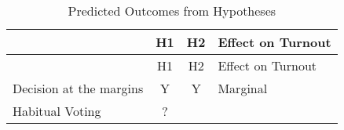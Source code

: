 \documentclass[12pt,twoside]{reedthesis}
\begin{document}
  \begin{longtable}[]{@{}lccl@{}}
  \caption{Predicted Outcomes from Hypotheses}\tabularnewline
  \toprule
  \begin{minipage}[b]{0.37\columnwidth}\raggedright\strut
  \strut
  \end{minipage} & \begin{minipage}[b]{0.06\columnwidth}\centering\strut
  H1\strut
  \end{minipage} & \begin{minipage}[b]{0.06\columnwidth}\centering\strut
  H2\strut
  \end{minipage} & \begin{minipage}[b]{0.25\columnwidth}\raggedright\strut
  Effect on Turnout\strut
  \end{minipage}\tabularnewline
  \midrule
  \endfirsthead
  \toprule
  \begin{minipage}[b]{0.37\columnwidth}\raggedright\strut
  \strut
  \end{minipage} & \begin{minipage}[b]{0.06\columnwidth}\centering\strut
  H1\strut
  \end{minipage} & \begin{minipage}[b]{0.06\columnwidth}\centering\strut
  H2\strut
  \end{minipage} & \begin{minipage}[b]{0.25\columnwidth}\raggedright\strut
  Effect on Turnout\strut
  \end{minipage}\tabularnewline
  \midrule
  \endhead
  \begin{minipage}[t]{0.37\columnwidth}\raggedright\strut
  Decision at the margins\strut
  \end{minipage} & \begin{minipage}[t]{0.06\columnwidth}\centering\strut
  Y\strut
  \end{minipage} & \begin{minipage}[t]{0.06\columnwidth}\centering\strut
  Y\strut
  \end{minipage} & \begin{minipage}[t]{0.25\columnwidth}\raggedright\strut
  Marginal\strut
  \end{minipage}\tabularnewline
  \begin{minipage}[t]{0.37\columnwidth}\raggedright\strut
  Habitual Voting\strut
  \end{minipage} & \begin{minipage}[t]{0.06\columnwidth}\centering\strut
  ?\strut
  \end{minipage} & \begin{minipage}[t]{0.06\columnwidth}\centering\strut

\end{minipage}
\end{longtable}
\end{document}
